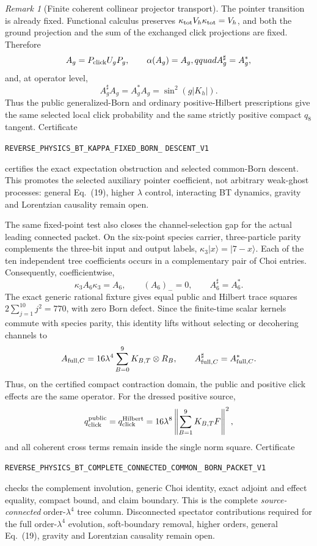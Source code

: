 \documentclass[11pt]{article}
\theoremstyle{definition}
\theoremstyle{remark}
\newtheorem{remark}[theorem]{Remark}
\begin{document}
\begin{remark}[Finite coherent collinear projector transport]
The pointer transition is already fixed.  Functional calculus preserves
$\kappa_{\rm tot}V_h\kappa_{\rm tot}=V_h$, and both the ground projection and
the sum of the exchanged click projections are fixed.  Therefore
\[
 A_g=P_{\rm click}U_gP_g,\qquad
 \alpha(A_g)=A_g,qquad A_g^\sharp=A_g^*,
\]
and, at operator level,
\[
 \boxed{A_g^\sharp A_g=A_g^*A_g=\sin^2(g|K_h|).}
\]
Thus the public generalized-Born and ordinary positive-Hilbert prescriptions
give the same selected local click probability and the same strictly positive
compact $q_8$ tangent.  Certificate
\par\noindent
\texttt{REVERSE\_PHYSICS\_BT\_KAPPA\_FIXED\_BORN\_}
\allowbreak\texttt{DESCENT\_V1}
\par\noindent
certifies the exact expectation obstruction and selected common-Born descent.
This promotes the selected auxiliary pointer coefficient, not arbitrary
weak-ghost processes: general Eq.~(19), higher $\lambda$ control, interacting
BT dynamics, gravity and Lorentzian causality remain open.

The same fixed-point test also closes the channel-selection gap for the
actual leading connected packet.  On the six-point species carrier,
three-particle parity complements the three-bit input and output labels,
\(\kappa_3|x\rangle=|7-x\rangle\).  Each of the ten independent tree
coefficients occurs in a complementary pair of Choi entries.  Consequently,
coefficientwise,
\[
 \kappa_3 A_6\kappa_3=A_6,\qquad (A_6)_-=0,
 \qquad A_6^\sharp=A_6^*.
\]
The exact generic rational fixture gives equal public and Hilbert trace
squares \(2\sum_{j=1}^{10}j^2=770\), with zero Born defect.  Since the
finite-time scalar kernels commute with species parity, this identity lifts
without selecting or decohering channels to
\[
 A_{{\rm full},C}=16\lambda^4\sum_{B=0}^{9}K_{B,T}\otimes R_B,
 \qquad A_{{\rm full},C}^\sharp=A_{{\rm full},C}^*.
\]
Thus, on the certified compact contraction domain, the public and positive
click effects are the same operator.  For the dressed positive source,
\[
 q_{\rm click}^{\rm public}=q_{\rm click}^{\rm Hilbert}
 =16\lambda^8\left\|\sum_{B=1}^{9}K_{B,T}F\right\|^2,
\]
and all coherent cross terms remain inside the single norm square.
Certificate
\par\noindent
\texttt{REVERSE\_PHYSICS\_BT\_COMPLETE\_CONNECTED\_COMMON\_}
\allowbreak\texttt{BORN\_PACKET\_V1}
\par\noindent
checks the complement involution, generic Choi identity, exact adjoint and
effect equality, compact bound, and claim boundary.  This is the complete
\emph{source-connected} order-\(\lambda^4\) tree column.  Disconnected
spectator contributions required for the full order-\(\lambda^4\) evolution,
soft-boundary removal, higher orders, general Eq.~(19), gravity and
Lorentzian causality remain open.


\end{remark}
\end{document}
